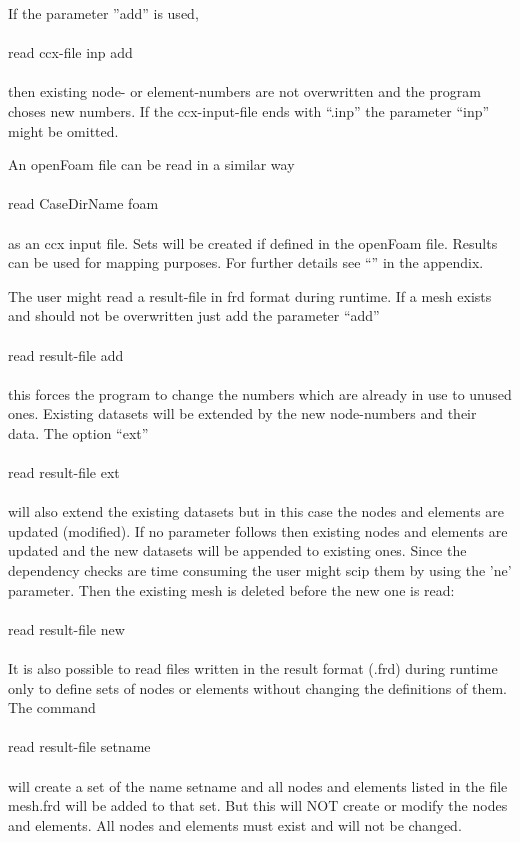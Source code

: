 \documentclass{article}
\begin{document}
If the parameter ''add'' is used,\\\\read ccx-file inp add\\\\ then existing node- or element-numbers are not overwritten and the program choses new numbers. If the ccx-input-file ends with ``.inp'' the parameter ``inp'' might be omitted.

An openFoam file \cite{OpenFOAM} can be read in a similar way\\\\read CaseDirName foam\\\\as an ccx input file. Sets will be created if defined in the openFoam file. Results can be used for mapping purposes. For further details see ``'' in the appendix.

The user might read a result-file in frd format during runtime. If a mesh exists and should not be overwritten just add the parameter ``add''\\\\read result-file add\\\\this forces the program to change the numbers which are already in use to unused ones. Existing datasets will be extended by the new node-numbers and their data. The option ``ext'' \\\\read result-file ext\\\\will also extend the existing datasets but in this case the nodes and elements are updated (modified). If no parameter follows then existing nodes and elements are updated and the new datasets will be appended to existing ones. Since the dependency checks are time consuming the user might scip them by using the 'ne' parameter. Then the existing mesh is deleted before the new one is read:\\\\read result-file new\\\\

It is also possible to read files written in the result format (.frd) during runtime only to define sets of nodes or elements without changing the definitions of them. The command\\\\read result-file setname\\\\will create a set of the name setname and all nodes and elements listed in the file mesh.frd will be added to that set. But this will NOT create or modify the nodes and elements. All nodes and elements must exist and will not be changed.
\end{document}

